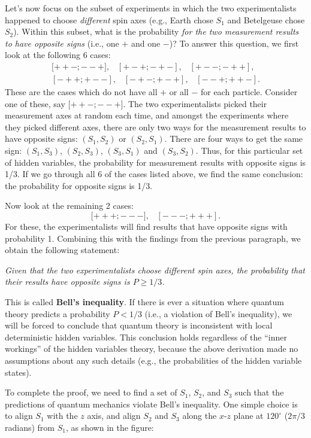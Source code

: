 \documentclass[pra,11pt]{revtex4}
\begin{document}
Let's now focus on the subset of experiments in which the two
experimentalists happened to choose \textit{different} spin axes
(e.g., Earth chose $S_1$ and Betelgeuse chose $S_2$).  Within this
subset, what is the probability \textit{for the two measurement
  results to have opposite signs} (i.e., one $+$ and one $-$)?  To
answer this question, we first look at the following 6 cases:
$$\begin{aligned}{[}{++-};{--+}], \;\;\; [{+-+};{-+-}], \;\;\; [{+--};{-++}],\\ [{-++};{+--}], \;\;\; [{-+-};{+-+}], \;\;\; [{--+};{++-}].\end{aligned}$$
These are the cases which do not have all $+$ or all $-$ for each
particle.  Consider one of these, say ${[}{++-};{--+}]$.  The two
experimentalists picked their measurement axes at random each time,
and amongst the experiments where they picked different axes, there
are only two ways for the measurement results to have opposite signs:
$(S_1,S_2)$ or $(S_2,S_1)$.  There are four ways to get the same sign:
$(S_1,S_3)$, $(S_2,S_3)$, $(S_3,S_1)$ and $(S_3, S_2)$.  Thus,
for this particular set of hidden variables, the probability for
measurement results with opposite signs is 1/3.  If we go through all
6 of the cases listed above, we find the same conclusion: the
probability for opposite signs is 1/3.

Now look at the remaining 2 cases:
$${[}{+++};{---}], \;\;\; [{---};{+++}].$$ For these, the
experimentalists will find results that have opposite signs with
probability 1.  Combining this with the findings from the previous
paragraph, we obtain the following statement:

\textit{Given that the two experimentalists choose different spin
  axes, the probability that their results have opposite signs is $P
  \ge 1/3$.}

This is called \textbf{Bell's inequality}.  If there is ever a
situation where quantum theory predicts a probability $P < 1/3$ (i.e.,
a violation of Bell's inequality), we will be forced to conclude that
quantum theory is inconsistent with local deterministic hidden
variables.  This conclusion holds regardless of the ``inner workings''
of the hidden variables theory, because the above derivation made no
assumptions about any such details (e.g., the probabilities of the
hidden variable states).

To complete the proof, we need to find a set of $S_1$, $S_2$, and
$S_3$ such that the predictions of quantum mechanics violate Bell's
inequality.  One simple choice is to align $S_1$ with the $z$ axis,
and align $S_2$ and $S_3$ along the $x$-$z$ plane at $120^\circ$
($2\pi/3$ radians) from $S_1$, as shown in the figure:
\end{document}
